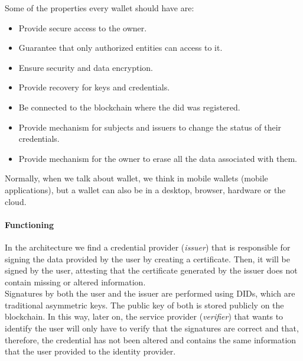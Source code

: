 \documentclass[a4paper, 12pt]{article} %
\begin{document}
                    Some of the properties every wallet should have are:
                    \begin{itemize}
                        \item Provide secure access to the owner.
                        \item Guarantee that only authorized entities can access to it.
                        \item Ensure security and data encryption.
                        \item Provide recovery for keys and credentials.
                        \item Be connected to the blockchain where the \acrshort{did} was registered.
                        \item Provide mechanism for subjects and issuers to change the status of their credentials.
                        \item Provide mechanism for the owner to erase all the data associated with them.
                    \end{itemize}
                    Normally, when we talk about wallet, we think in mobile wallets (mobile applications), but a wallet can also be in a desktop, browser, hardware or the cloud.
                
                \paragraph{Functioning}
                    In the architecture\cite{how-to-ssi} we find a credential provider (\textit{issuer}) that is responsible for signing the data provided by the user by creating a certificate. Then, it will be signed by the user, attesting that the certificate generated by the issuer does not contain missing or altered information.\\
                    
                    Signatures by both the user and the issuer are performed using DIDs, which are traditional asymmetric keys. The public key of both is stored publicly on the blockchain. In this way, later on, the service provider (\textit{verifier}) that wants to identify the user will only have to verify that the signatures are correct and that, therefore, the credential has not been altered and contains the same information that the user provided to the identity provider.\\
                    
\end{document}
